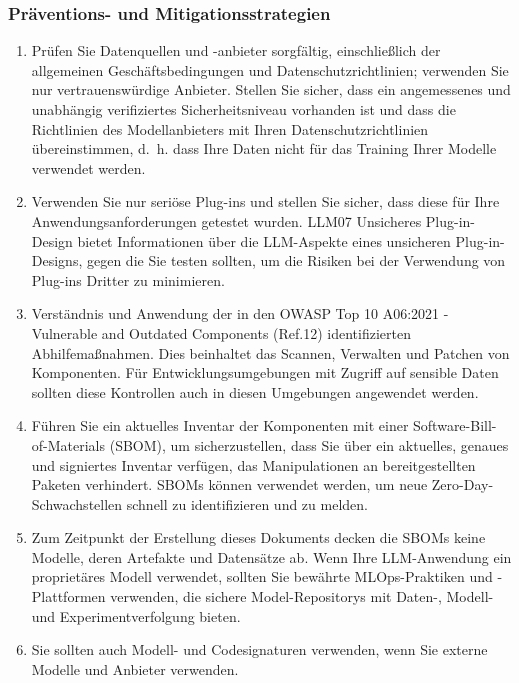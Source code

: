 \documentclass[
]{article}
\providecommand{\tightlist}{%
  \setlength{\itemsep}{0pt}\setlength{\parskip}{0pt}}
\begin{document}
\subsubsection{Präventions- und
Mitigationsstrategien}\label{pruxe4ventions--und-mitigationsstrategien}

\begin{enumerate}
\def\labelenumi{\arabic{enumi}.}
\tightlist
\item
  Prüfen Sie Datenquellen und -anbieter sorgfältig, einschließlich der
  allgemeinen Geschäftsbedingungen und Datenschutzrichtlinien; verwenden
  Sie nur vertrauenswürdige Anbieter. Stellen Sie sicher, dass ein
  angemessenes und unabhängig verifiziertes Sicherheitsniveau vorhanden
  ist und dass die Richtlinien des Modellanbieters mit Ihren
  Datenschutzrichtlinien übereinstimmen, d.~h. dass Ihre Daten nicht für
  das Training Ihrer Modelle verwendet werden.
\item
  Verwenden Sie nur seriöse Plug-ins und stellen Sie sicher, dass diese
  für Ihre Anwendungsanforderungen getestet wurden. LLM07 Unsicheres
  Plug-in-Design bietet Informationen über die LLM-Aspekte eines
  unsicheren Plug-in-Designs, gegen die Sie testen sollten, um die
  Risiken bei der Verwendung von Plug-ins Dritter zu minimieren.
\item
  Verständnis und Anwendung der in den OWASP Top 10 A06:2021 -
  Vulnerable and Outdated Components (Ref.12) identifizierten
  Abhilfemaßnahmen. Dies beinhaltet das Scannen, Verwalten und Patchen
  von Komponenten. Für Entwicklungsumgebungen mit Zugriff auf sensible
  Daten sollten diese Kontrollen auch in diesen Umgebungen angewendet
  werden.
\item
  Führen Sie ein aktuelles Inventar der Komponenten mit einer
  Software-Bill-of-Materials (SBOM), um sicherzustellen, dass Sie über
  ein aktuelles, genaues und signiertes Inventar verfügen, das
  Manipulationen an bereitgestellten Paketen verhindert. SBOMs können
  verwendet werden, um neue Zero-Day-Schwachstellen schnell zu
  identifizieren und zu melden.
\item
  Zum Zeitpunkt der Erstellung dieses Dokuments decken die SBOMs keine
  Modelle, deren Artefakte und Datensätze ab. Wenn Ihre LLM-Anwendung
  ein proprietäres Modell verwendet, sollten Sie bewährte
  MLOps-Praktiken und -Plattformen verwenden, die sichere
  Model-Repositorys mit Daten-, Modell- und Experimentverfolgung bieten.
\item
  Sie sollten auch Modell- und Codesignaturen verwenden, wenn Sie
  externe Modelle und Anbieter verwenden.

\end{enumerate}
\end{document}
